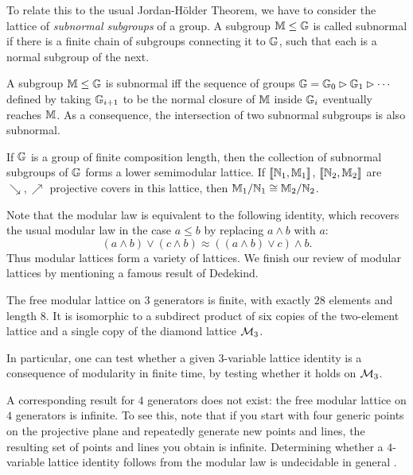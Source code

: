 \documentclass[letterpaper,11pt]{article}
\begin{document}
To relate this to the usual Jordan-H\"older Theorem, we have to consider the lattice of \emph{subnormal subgroups} of a group. A subgroup $\mathbb{M} \le \mathbb{G}$ is called subnormal if there is a finite chain of subgroups connecting it to $\mathbb{G}$, such that each is a normal subgroup of the next.

\begin{prop} A subgroup $\mathbb{M} \le \mathbb{G}$ is subnormal iff the sequence of groups $\mathbb{G} = \mathbb{G}_0 \rhd \mathbb{G}_1 \rhd \cdots$ defined by taking $\mathbb{G}_{i+1}$ to be the normal closure of $\mathbb{M}$ inside $\mathbb{G}_i$ eventually reaches $\mathbb{M}$. As a consequence, the intersection of two subnormal subgroups is also subnormal.
\end{prop}

\begin{prop} If $\mathbb{G}$ is a group of finite composition length, then the collection of subnormal subgroups of $\mathbb{G}$ forms a lower semimodular lattice. If $\llbracket \mathbb{N}_1, \mathbb{M}_1 \rrbracket$, $\llbracket \mathbb{N}_2, \mathbb{M}_2 \rrbracket$ are $\searrow, \nearrow$ projective covers in this lattice, then $\mathbb{M}_1/\mathbb{N}_1 \cong \mathbb{M}_2/\mathbb{N}_2$.
\end{prop}

Note that the modular law is equivalent to the following identity, which recovers the usual modular law in the case $a \le b$ by replacing $a \wedge b$ with $a$:
\[
(a \wedge b) \vee (c \wedge b) \approx ((a \wedge b) \vee c) \wedge b.
\]
Thus modular lattices form a variety of lattices. We finish our review of modular lattices by mentioning a famous result of Dedekind.

\begin{prop} The free modular lattice on $3$ generators is finite, with exactly $28$ elements and length $8$. It is isomorphic to a subdirect product of six copies of the two-element lattice and a single copy of the diamond lattice $\mathcal{M}_3$.

In particular, one can test whether a given $3$-variable lattice identity is a consequence of modularity in finite time, by testing whether it holds on $\mathcal{M}_3$.
\end{prop}

A corresponding result for $4$ generators does not exist: the free modular lattice on $4$ generators is infinite. To see this, note that if you start with four generic points on the projective plane and repeatedly generate new points and lines, the resulting set of points and lines you obtain is infinite. Determining whether a $4$-variable lattice identity follows from the modular law is undecidable in general \cite{free-modular-undecidable}.
\end{document}
